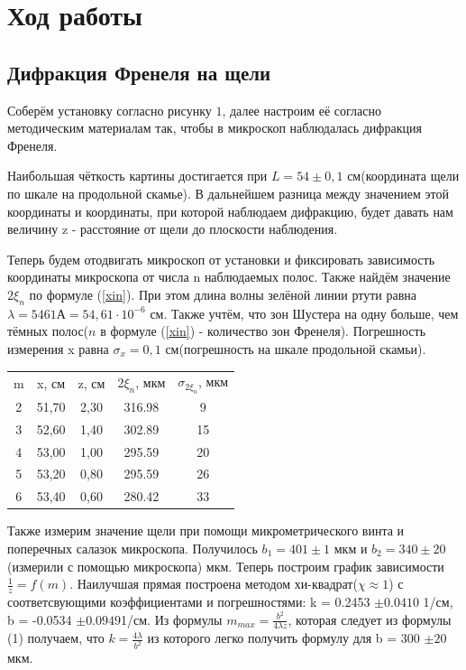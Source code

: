 \documentclass[a4paper,12pt]{article}
\begin{document}
\section{}
\section{Ход работы}
\subsection{Дифракция Френеля на щели}
Соберём установку согласно рисунку $1$, далее настроим её согласно методическим материалам так, чтобы в микроскоп наблюдалась дифракция Френеля.

Наибольшая чёткость картины достигается при $L = 54 \pm 0,1$ см(координата щели по шкале на продольной скамье). В дальнейшем разница между значением этой координаты и координаты, при которой наблюдаем дифракцию, будет давать нам величину z - расстояние от щели до плоскости наблюдения.

Теперь будем отодвигать микроскоп от установки и фиксировать зависимость координаты микроскопа от числа n наблюдаемых полос. Также найдём значение $2\xi_n$ по формуле (\ref{xin}). При этом длина волны зелёной линии ртути равна $\lambda = 5461 А = 54,61 \cdot 10^{-6}$ см. Также учтём, что зон Шустера на одну больше, чем тёмных полос($n$ в формуле (\ref{xin}) - количество зон Френеля). Погрешность измерения x равна $\sigma_x = 0,1$ см(погрешность на шкале продольной скамьи).

\begin{table}[H]
    \centering
    \begin{tabular}{ccccc}
      m  & x, см  & z, см & 2$\xi_n$, мкм & $\sigma_{2\xi_n}$, мкм\\
      2   & 51,70 & 2,30  & 316.98 & 9 \\
      3   & 52,60 & 1,40  & 302.89 & 15\\
      4   & 53,00 & 1,00 & 295.59 & 20\\
      5   & 53,20 & 0,80  & 295.59 & 26\\
      6   & 53,40 & 0,60  & 280.42 & 33\\
    \end{tabular}
    \label{tab:my_label}
\end{table}
Также измерим значение щели при помощи микрометрического винта и поперечных салазок микроскопа. Получилось $b_1 = 401 \pm 1 $ мкм и $b_2 = 340 \pm 20$(измерили с помощью микроскопа) мкм. Теперь построим график зависимости $\frac{1}{z}= f(m)$. Наилучшая прямая построена методом хи-квадрат($\chi \approx 1 $) с соответсвующими коэффициентами и погрешностями: k = 0.2453 $\pm 0.0410$ 1/см, b = -0.0534 $\pm 0.0949$1/см. Из формулы $m_{max} = \frac{b^{2}}{4\lambda z}$, которая следует из формулы (1) получаем, что $k = \frac{4 \lambda}{b^{2}}$ из которого легко получить формулу для b = 300 $\pm 20$ мкм.
\end{document}
